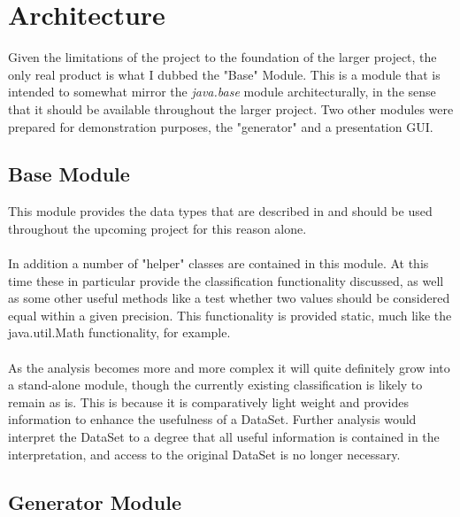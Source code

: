 \documentclass[main.tex]{subfiles}
\begin{document}
      
  \section{Architecture}
    
    Given the limitations of the project to the foundation of the larger project, the only real product is what I dubbed the "Base" Module. This is a module that is intended to somewhat mirror the \textit{java.base} module architecturally, in the sense that it should be available throughout the larger project. Two other modules were prepared for demonstration purposes, the "generator" and a presentation  GUI.
    
    \subsection{Base Module}
      
      This module provides the data types that are described in  and should be used throughout the upcoming project for this reason alone. 
      \\\\
      In addition a number of "helper" classes are contained in this module. At this time these in particular provide the classification functionality discussed, as well as some other useful methods like a test whether two values should be considered equal within a given precision. This functionality is provided static, much like the java.util.Math functionality, for example.
      \\\\
      As the analysis becomes more and more complex it will quite definitely grow into a stand-alone module, though the currently existing classification is likely to remain as is. This is because it is comparatively light weight and provides information to enhance the usefulness of a DataSet. Further analysis would interpret the DataSet to a degree that all useful information is contained in the interpretation, and access to the original DataSet is no longer necessary.
      
    \subsection{Generator Module}
      
\end{document}
